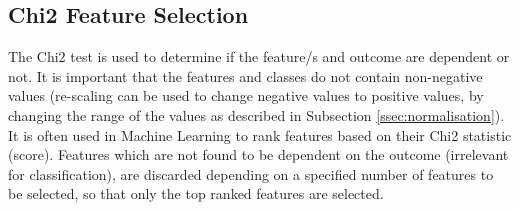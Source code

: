 \subsection{Chi2 Feature Selection}\label{ssec:chisquared}
The Chi2 test \cite{jin2006machine} is used to determine if the feature/s and outcome are dependent or not. It is important that the features and classes do not contain non-negative values (re-scaling can be used to change negative values to positive values, by changing the range of the values as described in Subsection \ref{ssec:normalisation}). It is often used in Machine Learning to rank features based on their Chi2 statistic (score). Features which are not found to be dependent on the outcome (irrelevant for classification), are discarded depending on a specified number of features to be selected, so that only the top ranked features are selected. 